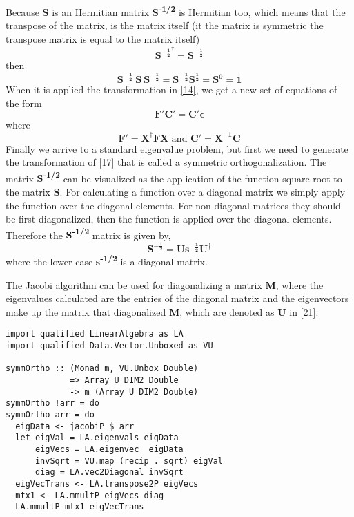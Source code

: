 \documentclass{tmr}
\begin{document}
Because \textbf{S} is an Hermitian matrix  \textbf{S\textsuperscript{-1/2}} is Hermitian too,
which means that the transpose of the matrix, is the matrix itself (it the matrix is
symmetric the transpose matrix is equal to the matrix itself)
\[ \mathbf{{S^{-\frac{1}{2}}}^{\dagger}} = \mathbf{S^{-\frac{1}{2}}} \]
then
\[ \mathbf{S^{-\frac{1}{2}}\ S\ S^{-\frac{1}{2}}} =  \mathbf{S^{-\frac{1}{2}} S^{\frac{1}{2}}}
= \mathbf{S^0} = \mathbf{1}
\]
When it is applied the transformation in \eqref{14},
we get a new set of equations of the form
\begin{equation}\label{19}
\mathbf{F'C'} = \mathbf{C'\epsilon} 
\end{equation}
where 
\begin{equation}\label{20}
\mathbf{F'} = \mathbf{X^{\dagger}FX} \text{ and }  \mathbf{C'} = \mathbf{X^{-1}C}
\end{equation}
Finally we arrive to a standard eigenvalue problem, but first we need to generate
the transformation of \eqref{17} that is called a symmetric orthogonalization. The
matrix \textbf{S\textsuperscript{-1/2}} can be visualized as the application of the 
function square root to the matrix \textbf{S}. For calculating a
function over a diagonal matrix we simply apply the function
over the diagonal elements. For non-diagonal matrices they should be first diagonalized, then
the function is applied over the diagonal elements. Therefore the \textbf{S\textsuperscript{-1/2}}
matrix is given by,
\begin{equation}\label{21}
\mathbf{S^{-\frac{1}{2}}} = \mathbf{U{s^{-\frac{1}{2}}}U^{\dagger}}
\end{equation}
where the lower case \textbf{s\textsuperscript{-1/2}} is a diagonal matrix. 

\par The Jacobi algorithm can be used for diagonalizing a matrix \textbf{M},
where the eigenvalues calculated are the entries of the diagonal matrix
and the eigenvectors make up the matrix that diagonalized \textbf{M},
which are denoted as \textbf{U} in \eqref{21}. 

\begin{lstlisting}[float,captionpos=b,belowcaptionskip=4pt, caption= Symmetric Orthogonalization]
import qualified LinearAlgebra as LA
import qualified Data.Vector.Unboxed as VU

symmOrtho :: (Monad m, VU.Unbox Double) 
             => Array U DIM2 Double 
             -> m (Array U DIM2 Double)
symmOrtho !arr = do
symmOrtho arr = do
  eigData <- jacobiP $ arr
  let eigVal = LA.eigenvals eigData
      eigVecs = LA.eigenvec  eigData
      invSqrt = VU.map (recip . sqrt) eigVal
      diag = LA.vec2Diagonal invSqrt
  eigVecTrans <- LA.transpose2P eigVecs
  mtx1 <- LA.mmultP eigVecs diag
  LA.mmultP mtx1 eigVecTrans
\end{lstlisting}
\end{document}
